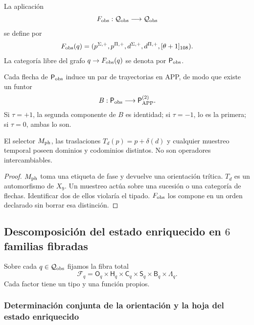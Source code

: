 {\begin{definition}
\label{p12-83-c1-s3:def:tpk-evolucion-observable}
La aplicación
\[
 F_{\rm obs}:\mathcal Q_{\rm obs}\longrightarrow\mathcal Q_{\rm obs}
\]
se define por
\[
 F_{\rm obs}(q)=
 (p^{\Sigma,+},p^{\Pi,+},d^{\Sigma,+},d^{\Pi,+},[\theta+1]_{108}).
\]
La categoría libre del grafo \(q\to F_{\rm obs}(q)\) se denota por
\(\mathsf P_{\rm obs}\).
\end{definition}

Cada flecha de \(\mathsf P_{\rm obs}\) induce un par de trayectorias en
APP, de modo que existe un funtor
\[
 B:\mathsf P_{\rm obs}\longrightarrow
 \mathsf P_{\rm APP}^{(2)}.
\]
Si \(\tau=+1\), la segunda componente de \(B\) es identidad; si
\(\tau=-1\), lo es la primera; si \(\tau=0\), ambas lo son.

\begin{proposition}
\label{p12-83-c1-s3:prop:tpk-separacion-seleccion-movimiento}
El selector \(M_{\rm ph}\), las traslaciones
\(T_d(p)=p+\delta(d)\) y cualquier muestreo temporal poseen dominios y
codominios distintos. No son operadores intercambiables.
\end{proposition}

\begin{proof}
\(M_{\rm ph}\) toma una etiqueta de fase y devuelve una orientación trítica.
\(T_d\) es un automorfismo de \(X_9\). Un muestreo actúa sobre una
sucesión o una categoría de flechas. Identificar dos de ellos violaría el
tipado. \(F_{\rm obs}\) los compone en un orden declarado sin borrar esa
distinción.
\end{proof}

\subsection{Descomposición del estado enriquecido en \(6\) familias fibradas}

Sobre cada \(q\in\mathcal Q_{\rm obs}\) fijamos la fibra total
\[
 \mathcal F_q=
 \mathsf O_q\times
 \mathsf H_q\times
 \mathsf C_q\times
 \mathsf S_q\times
 \mathsf B_q\times
 \Lambda_q.
\]
Cada factor tiene un tipo y una función propios.

\subsubsection{Determinación conjunta de la orientación y la hoja del estado enriquecido}

}
